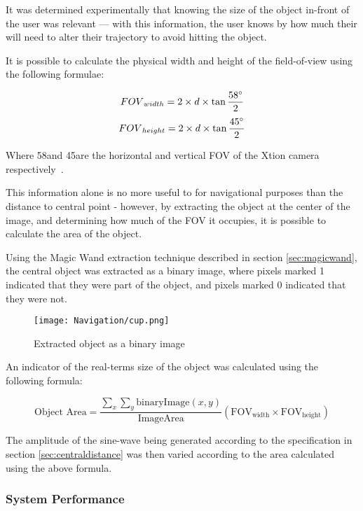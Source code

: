 It was determined experimentally that knowing the size of the object in-front of the user was relevant --- with this information, the user knows by how much their will need to alter their trajectory to avoid hitting the object. 

It is possible to calculate the physical width and height of the field-of-view using the following formulae:

\begin{equation}
{FOV}_{width} = 2 \times d \times \tan\frac{58\degree}{2}
\end{equation}
\begin{equation}
{FOV}_{height} = 2 \times d \times \tan\frac{45\degree}{2}
\end{equation}

Where 58\degree  and 45\degree  are the horizontal and vertical \ac{FOV} of the Xtion camera respectively~\cite{xtion-spec}. 

This information alone is no more useful to for navigational purposes than the distance to central point - however, by extracting the object at the center of the image, and determining how much of the \ac{FOV} it occupies, it is possible to calculate the area of the object.

Using the Magic Wand extraction technique described in section \ref{sec:magicwand}, the central object was extracted as a binary image, where pixels marked 1 indicated that they were part of the object, and pixels marked 0 indicated that they were not. 
\begin{figure}[H]
    \centering
    \texttt{[image: Navigation/cup.png]}
    \caption{Extracted object as a binary image}
\end{figure}

An indicator of the real-terms size of the object was calculated using the following formula:

\begin{equation}
    \mbox{Object Area} = \frac{\sum\limits_x\sum\limits_y \mbox{binaryImage}({x}, {y})}{\mbox{ImageArea}} ({\mbox{FOV}}_{\mbox{width}} \times {\mbox{FOV}}_{\mbox{height}})
\end{equation}

The amplitude of the sine-wave being generated according to the specification in section \ref{sec:centraldistance} was then varied according to the area calculated using the above formula.

\subsubsection{System Performance}

